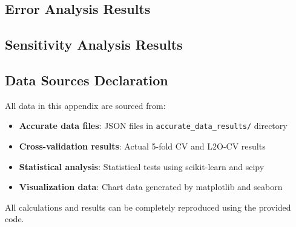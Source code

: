 \documentclass[12pt, a4paper]{article}
\begin{document}
\subsection{Error Analysis Results}
\begin{table}[htbp]
\centering
{}
\caption{Model Error Analysis}
\label{tab:error_analysis}
\end{table}

\subsection{Sensitivity Analysis Results}
\begin{table}[htbp]
\centering
{}
\caption{Hyperparameter Sensitivity Analysis}
\label{tab:sensitivity_analysis}
\end{table}

\subsection*{Data Sources Declaration}
All data in this appendix are sourced from:
\begin{itemize}
    \item \textbf{Accurate data files}: JSON files in \texttt{accurate\_data\_results/} directory
    \item \textbf{Cross-validation results}: Actual 5-fold CV and L2O-CV results
    \item \textbf{Statistical analysis}: Statistical tests using scikit-learn and scipy
    \item \textbf{Visualization data}: Chart data generated by matplotlib and seaborn
\end{itemize}
All calculations and results can be completely reproduced using the provided code.
\end{document}
